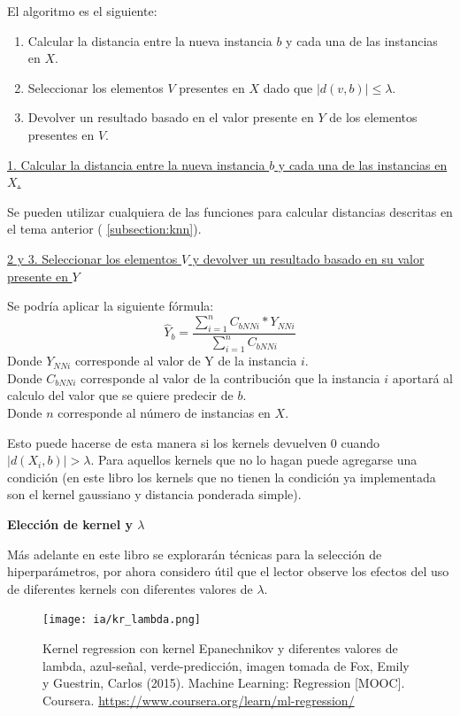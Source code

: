 \documentclass[11pt,fleqn]{book} %
\begin{document}
El algoritmo es el siguiente:
\begin{enumerate}
\item Calcular la distancia entre la nueva instancia $b$ y cada una de las instancias en $X$.
\item Seleccionar los elementos $V$ presentes en $X$ dado que $|d(v,b)|\leq \lambda$.
\item Devolver un resultado basado en el valor presente en $Y$ de los elementos presentes en $V$.
\end{enumerate}

\underline{1. Calcular la distancia entre la nueva instancia $b$ y cada una de las instancias en $X$.}

Se pueden utilizar cualquiera de las funciones para calcular distancias descritas en el tema anterior ( \ref{subsection:knn}).

\underline{2 y 3. Seleccionar los elementos $V$ y devolver un resultado basado en su valor presente en $Y$}

Se podría aplicar la siguiente fórmula:
\begin{equation}
\hat{Y}_b=\frac{\sum_{i=1}^{n} C_{bNNi}*Y_{NNi}}{\sum_{i=1}^{n} C_{bNNi}} 
\end{equation}
Donde $Y_{NNi}$ corresponde al valor de Y de la instancia $i$.\\
Donde $C_{bNNi}$ corresponde al valor de la contribución que la instancia $i$ aportará al calculo del valor que se quiere predecir de $b$.\\
Donde $n$ corresponde al número de instancias en $X$.

Esto puede hacerse de esta manera si los kernels devuelven 0 cuando $|d(X_i,b)| > \lambda$. Para aquellos kernels que no lo hagan puede agregarse una condición (en este libro los kernels que no tienen la condición ya implementada son el kernel gaussiano y distancia ponderada simple).

\textbf{Elección de kernel y $\lambda$}

Más adelante en este libro se explorarán técnicas para la selección de hiperparámetros, por ahora considero útil que el lector observe los efectos del uso de diferentes kernels con diferentes valores de $\lambda$.

\begin{figure}[ht]
\centering\texttt{[image: ia/kr\_lambda.png]}
\caption{Kernel regression con kernel Epanechnikov y diferentes valores de lambda, azul-señal, verde-predicción, imagen tomada de Fox, Emily y Guestrin, Carlos (2015). Machine Learning: Regression [MOOC]. Coursera. \url{https://www.coursera.org/learn/ml-regression/}}

\label{fig:kernel_regression_epanechikov} 
\end{figure}
\end{document}
